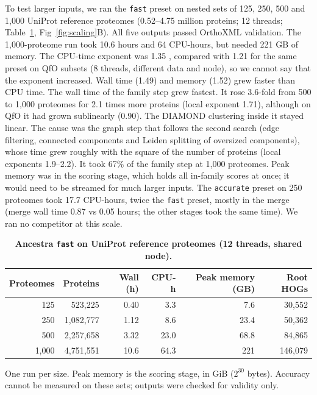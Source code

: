 To test larger inputs, we ran the \texttt{fast} preset on nested sets of 125, 250, 500 and 1,000 UniProt reference proteomes (0.52--4.75 million proteins; 12 threads; Table~\ref{tab:large}, Fig~\ref{fig:scaling}B). All five outputs passed OrthoXML validation. The 1,000-proteome run took 10.6 hours and 64 CPU-hours, but needed 221 GB of memory. The CPU-time exponent was 1.35 , compared with 1.21  for the same preset on QfO subsets (8 threads, different data and node), so we cannot say that the exponent increased. Wall time (1.49) and memory (1.52) grew faster than CPU time. The wall time of the family step grew fastest. It rose 3.6-fold from 500 to 1,000 proteomes for 2.1 times more proteins (local exponent 1.71), although on QfO it had grown sublinearly (0.90). The DIAMOND clustering inside it stayed linear. The cause was the graph step that follows the second search (edge filtering, connected components and Leiden splitting of oversized components), whose time grew roughly with the square of the number of proteins (local exponents 1.9--2.2). It took 67\% of the family step at 1,000 proteomes. Peak memory was in the scoring stage, which holds all in-family scores at once; it would need to be streamed for much larger inputs. The \texttt{accurate} preset on 250 proteomes took 17.7 CPU-hours, twice the \texttt{fast} preset, mostly in the merge (merge wall time 0.87 vs 0.05 hours; the other stages took the same time). We ran no competitor at this scale.

\begin{table}[!ht]
\centering
\caption{{\bf Ancestra \texttt{fast} on UniProt reference proteomes (12 threads, shared node).}}
\begin{tabular}{rrrrrr}
\hline
Proteomes & Proteins & Wall (h) & CPU-h & Peak memory (GB) & Root HOGs\\
\hline
125 & 523,225 & 0.40 & 3.3 & 7.6 & 30,552\\
250 & 1,082,777 & 1.12 & 8.6 & 23.4 & 50,362\\
500 & 2,257,658 & 3.32 & 23.0 & 68.8 & 84,865\\
1,000 & 4,751,551 & 10.6 & 64.3 & 221 & 146,079\\
\hline
\end{tabular}
\begin{flushleft}One run per size. Peak memory is the scoring stage, in GiB ($2^{30}$ bytes). Accuracy cannot be measured on these sets; outputs were checked for validity only.
\end{flushleft}
\label{tab:large}
\end{table}

